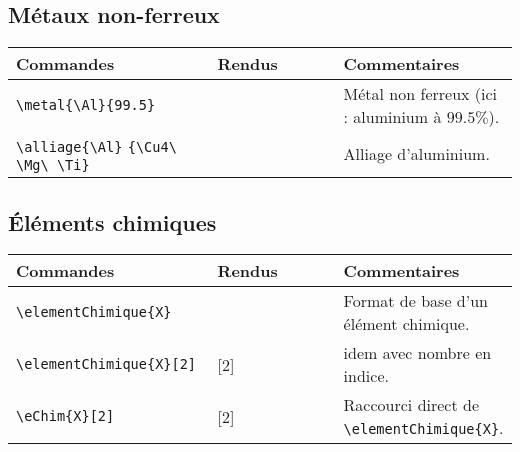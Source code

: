 \documentclass[a4paper,12pt]{article}
\begin{document}
	\subsection{Métaux non-ferreux}

		\begin{tabular}{|p{0.4\linewidth}|p{0.25\linewidth}|p{0.35\linewidth}|}
			\hline
				\textbf{Commandes}&\textbf{Rendus}&\textbf{Commentaires}
			\\\hline\hline
				\verb!\metal{\Al}{99.5}!	&	\metal{\Al}{99.5}		&	Métal non ferreux (ici : aluminium à $99.5\%$).
			\\\hline
				\verb!\alliage{\Al}! \verb!{\Cu4\ \Mg\ \Ti}!	&	\alliage{\Al}{\Cu4\ \Mg\ \Ti}		&	Alliage d'aluminium.
			\\\hline
		\end{tabular}


	\subsection{Éléments chimiques}


		\begin{tabular}{|p{0.4\linewidth}|p{0.25\linewidth}|p{0.35\linewidth}|}
			\hline
				\textbf{Commandes}&\textbf{Rendus}&\textbf{Commentaires}
			\\\hline\hline
				\verb!\elementChimique{X}!	&	\elementChimique{X}		&	Format de base d'un élément chimique.
			\\\hline
				\verb!\elementChimique{X}[2]!	&	\elementChimique{X}[2]		&	idem avec nombre en indice.
			\\\hline
				\verb!\eChim{X}[2]!	&	\eChim{X}[2]		&	Raccourci direct de \verb!\elementChimique{X}!.
			\\\hline
		\end{tabular}
\end{document}
